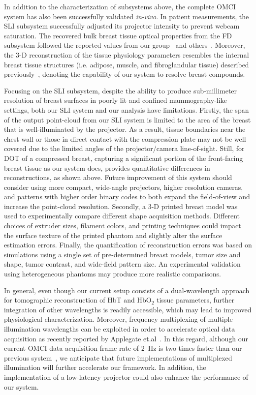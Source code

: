 In addition to the characterization of subsystems above, the complete \ac{OMCI} system has also been successfully validated \textit{in-vivo}. In patient measurements, the \ac{SLI} subsystem successfully adjusted its projector intensity to prevent webcam saturation. The recovered bulk breast tissue optical properties from the \ac{FD} subsystem followed the reported values from our group~\cite{Fang2009} and others~\cite{Durduran2002}. Moreover, the 3-D reconstruction of the tissue physiology parameters resembles the internal breast tissue structures (i.e. adipose, muscle, and fibroglandular tissue) described previously~\cite{Fang2009}, denoting the capability of our system to resolve breast compounds.

Focusing on the \ac{SLI} subsystem, despite the ability to produce sub-millimeter resolution of breast surfaces in poorly lit and confined mammography-like settings, both our \ac{SLI} system and our analysis have limitations. Firstly, the span of the output point-cloud from our \ac{SLI} system is limited to the area of the breast that is well-illuminated by the projector. As a result, tissue boundaries near the chest wall or those in direct contact with the compression plate may not be well covered due to the limited angles of the projector/camera line-of-sight. Still, for \ac{DOT} of a compressed breast, capturing a significant portion of the front-facing breast tissue as our system does, provides quantitative differences in reconstructions, as shown above. Future improvement of this system should consider using more compact, wide-angle projectors, higher resolution cameras, and patterns with higher order binary codes to both expand the field-of-view and increase the point-cloud resolution. Secondly, a 3-D printed breast model was used to experimentally compare different shape acquisition methods. Different choices of extruder sizes, filament colors, and printing techniques could impact the surface texture of the printed phantom and slightly alter the surface estimation errors. Finally, the quantification of reconstruction errors was based on simulations using a single set of pre-determined breast models, tumor size and shape, tumor contrast, and wide-field pattern size. An experimental validation using heterogeneous phantoms may produce more realistic comparisons.

In general, even though our current setup consists of a dual-wavelength approach for tomographic reconstruction of HbT and HbO$_2$ tissue parameters, further integration of other wavelengths is readily accessible, which may lead to improved physiological characterization. Moreover, frequency multiplexing of multiple illumination wavelengths can be exploited in order to accelerate optical data acquisition as recently reported by Applegate et.al~\cite{Applegate2017}. In this regard, although our current \ac{OMCI} data acquisition frame rate of 2~Hz is two times faster than our previous system~\cite{Zimmermann2017}, we anticipate that future implementations of multiplexed illumination will further accelerate our framework. In addition, the implementation of a low-latency projector could also enhance the performance of our system. 

